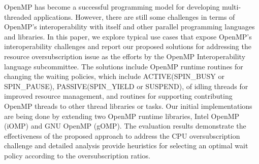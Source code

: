 OpenMP has become a successful programming model
for developing multi-threaded applications.
However, there are still some challenges in terms of OpenMP's interoperability
with itself and other parallel programming languages and libraries.
In this paper, we explore typical use cases that expose OpenMP's interoperability challenges and
report our proposed solutions for addressing the resource oversubscription issue as the efforts
by the OpenMP Interoperability language subcommittee. 
The solutions include OpenMP runtime routines for
changing the waiting policies, which include ACTIVE(SPIN\_BUSY or SPIN\_PAUSE), 
PASSIVE(SPIN\_YIELD or SUSPEND), 
of idling threads for improved resource management, and 
routines for supporting contributing OpenMP threads to other thread libraries or tasks. 
Our initial implementations are being done by extending two OpenMP runtime libraries, 
Intel OpenMP (iOMP) and GNU OpenMP (gOMP).
The evaluation results demonstrate the effectiveness of the proposed approach to address the CPU 
oversubscription challenge and detailed analysis provide heuristics for selecting an optimal wait policy according
to the oversubscription ratios. 


